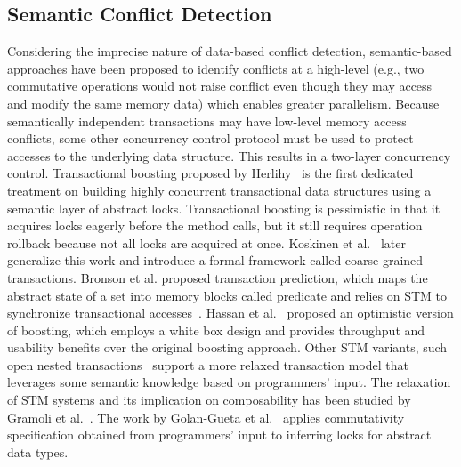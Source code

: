\documentclass[]{sig-alternate-05-2015}
\begin{document}
\subsection{Semantic Conflict Detection}
Considering the imprecise nature of data-based conflict detection, semantic-based approaches have been proposed to identify conflicts at a high-level (e.g., two commutative operations would not raise conflict even though they may access and modify the same memory data) which enables greater parallelism.
Because semantically independent transactions may have low-level memory access conflicts, some other concurrency control protocol must be used to protect accesses to the underlying data structure.
This results in a two-layer concurrency control.
Transactional boosting proposed by Herlihy~\cite{herlihy2008transactional} is the first dedicated treatment on building highly concurrent transactional data structures using a semantic layer of abstract locks. 
Transactional boosting is pessimistic in that it acquires locks eagerly before the method calls, but it still requires operation rollback because not all locks are acquired at once.
Koskinen et al.~\cite{koskinen2010coarse} later generalize this work and introduce a formal framework called coarse-grained transactions.
Bronson et al. proposed transaction prediction, which maps the abstract state of a set into memory blocks called predicate and relies on STM to synchronize transactional accesses~\cite{bronson2010transactional}.
Hassan et al.~\cite{hassan2014developing} proposed an optimistic version of boosting, which employs a white box design and provides throughput and usability benefits over the original boosting approach.
Other STM variants, such open nested transactions~\cite{ni2007open} support a more relaxed transaction model that leverages some semantic knowledge based on programmers' input.
The relaxation of STM systems and its implication on composability has been studied by Gramoli et al.~\cite{gramoli2013composing}.
The work by Golan-Gueta et al.~\cite{golan2015automatic} applies commutativity specification obtained from programmers' input to inferring locks for abstract data types.
\end{document}
